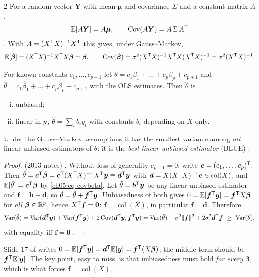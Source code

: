 \begin{paracol}{2}
For a random vector $\bm Y$ with mean $\bm\mu$ and covariance $\Sigma$ and a constant matrix $A$,
\[
  \mathbb{E}[A\bm Y]=A\bm\mu,\qquad \operatorname{Cov}(A\bm Y)=A\,\Sigma\,A^{\mathsf T}
\]
. With $A=(X^{\mathsf T} X)^{-1}X^{\mathsf T}$ this gives, under Gauss--Markov,
\begin{equation}\label{ch05:eq-covbeta}
  \mathbb{E}[\hat{\bm\beta}]=(X^{\mathsf T} X)^{-1}X^{\mathsf T} X\bm\beta=\bm\beta,\qquad
  \operatorname{Cov}(\hat{\bm\beta})=\sigma^2(X^{\mathsf T} X)^{-1}X^{\mathsf T} X(X^{\mathsf T} X)^{-1}=\sigma^2(X^{\mathsf T} X)^{-1}.
\end{equation}

\begin{theorem}\label{ch05:thm-gm}
For known constants $c_1,\dots,c_{p+1}$ let $\theta=c_1\beta_1+\dots+c_p\beta_p+c_{p+1}$ and
$\hat\theta=c_1\hat\beta_1+\dots+c_p\hat\beta_p+c_{p+1}$ with the OLS estimates. Then $\hat\theta$ is
\begin{enumerate}[(i)]
  \item unbiased;
  \item linear in $\bm y$, $\hat\theta=\sum_ib_iy_i$ with constants $b_i$ depending on $X$ only.
\end{enumerate}
Under the Gauss--Markov assumptions it has the smallest variance among \emph{all} linear unbiased estimators
of $\theta$: it is the \emph{best linear unbiased estimator} (BLUE)  .
\end{theorem}
\begin{proof}
(2013 notes) . Without loss of generality $c_{p+1}=0$; write $\bm c=(c_1,\dots,c_p)^{\mathsf T}$. Then
$\hat\theta=\bm c^{\mathsf T}\hat{\bm\beta}=\bm c^{\mathsf T}(X^{\mathsf T} X)^{-1}X^{\mathsf T}\bm y\equiv\bm d^{\mathsf T}\bm y$ with $\bm d=X(X^{\mathsf T} X)^{-1}\bm c\in\operatorname{col}(X)$, and
$\mathbb{E}[\hat\theta]=\bm c^{\mathsf T}\bm\beta$ by \eqref{ch05:eq-covbeta}. Let $\tilde\theta=\bm b^{\mathsf T}\bm y$ be any linear unbiased estimator and
$\bm f=\bm b-\bm d$, so $\tilde\theta=\hat\theta+\bm f^{\mathsf T}\bm y$. Unbiasedness of both gives
$0=\mathbb{E}[\bm f^{\mathsf T}\bm y]=\bm f^{\mathsf T} X\bm\beta$ for \emph{all} $\bm\beta\in\mathbb{R}^p$, hence $X^{\mathsf T}\bm f=\bm 0$: $\bm f\perp\operatorname{col}(X)$, in particular
$\bm f\perp\bm d$. Therefore
\[
  \Var(\tilde\theta)=\Var(\bm d\T\bm y)+\Var(\bm f\T\bm y)+2\Cov(\bm d\T\bm y,\bm f\T\bm y)
  =\Var(\hat\theta)+\sigma^2\|\bm f\|^2+2\sigma^2\bm d\T\bm f\ \ge\ \Var(\hat\theta),
\]
with equality iff $\bm f=\bm 0$ .
\end{proof}

\begin{coursenote}
Slide 17 of  writes $0=\mathbb{E}[\bm f^{\mathsf T}\bm y]=\bm d^{\mathsf T}\mathbb{E}[\bm y]=\bm f^{\mathsf T}(X\bm\beta)$; the middle term should be
$\bm f^{\mathsf T}\mathbb{E}[\bm y]$. The key point, easy to miss, is that unbiasedness must hold \emph{for every} $\bm\beta$, which is
what forces $\bm f\perp\operatorname{col}(X)$.
\end{coursenote}


\end{paracol}
